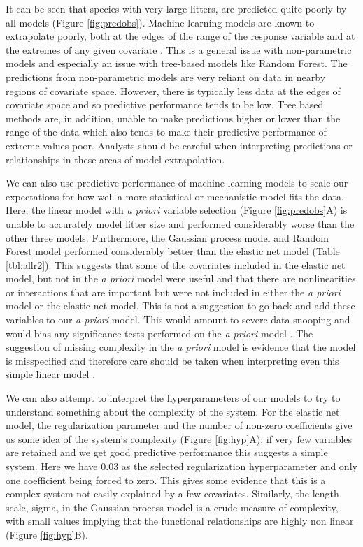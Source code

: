 \documentclass[12pt]{article}
\begin{document}
It can be seen that species with very large litters, are predicted quite poorly by all models  (Figure \ref{fig:predobs}).
Machine learning models are known to extrapolate poorly, both at the edges of the range of the response variable and at the extremes of any given covariate \citep{elith2010art}.
This is a general issue with non-parametric models and especially an issue with tree-based models like Random Forest.
The predictions from non-parametric models are very reliant on data in nearby regions of covariate space.
However, there is typically less data at the edges of covariate space and so predictive performance tends to be low.
Tree based methods are, in addition, unable to make predictions higher or lower than the range of the data which also tends to make their predictive performance of extreme values poor.
Analysts should be careful when interpreting predictions or relationships in these areas of model extrapolation. 

We can also use predictive performance of machine learning models to scale our expectations for how well a more statistical or mechanistic model fits the data.
Here, the linear model with \emph{a priori} variable selection (Figure \ref{fig:predobs}A) is unable to accurately model litter size and performed considerably worse than the other three models.
Furthermore, the Gaussian process model and Random Forest model performed considerably better than the elastic net model (Table \ref{tbl:allr2}).
This suggests that some of the covariates included in the elastic net model, but not in the \emph{a priori} model were useful and that there are nonlinearities or interactions that are important but were not included in either the \emph{a priori} model or the elastic net model.
This is not a suggestion to go back and add these variables to our \emph{a priori} model.
This would amount to severe data snooping and would bias any significance tests performed on the \emph{a priori} model \citep{white2000reality, gelman2014statistical}.
The suggestion of missing complexity in the \emph{a priori} model is evidence that the model is misspecified and therefore care should be taken when interpreting even this simple linear model \citep{lyddon2018nonparametric, maldonado1993interpreting}. 


We can also attempt to interpret the hyperparameters of our models to try to understand something about the complexity of the system.
For the elastic net model, the regularization parameter and the number of non-zero coefficients give us some idea of the system's complexity (Figure \ref{fig:hyp}A); if very few variables are retained and we get good predictive performance this suggests a simple system.
Here we have 0.03 as the selected regularization hyperparameter and only one coefficient being forced to zero.
This gives some evidence that this is a complex system not easily explained by a few covariates.
Similarly, the length scale, sigma, in the Gaussian process model is a crude measure of complexity, with small values implying that the functional relationships are highly non linear (Figure \ref{fig:hyp}B).
\end{document}
